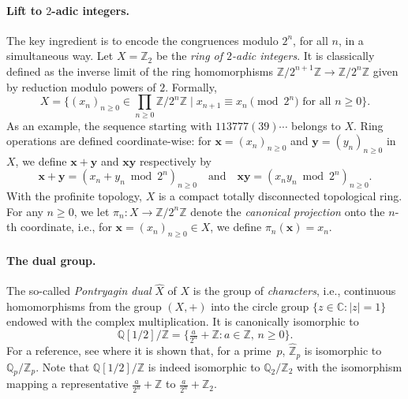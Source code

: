 \documentclass[12pt,reqno]{article}
\newcommand{\Z}{\mathbb{Z}}
\begin{document}

\paragraph{Lift to $2$-adic integers.} The key ingredient is to encode the congruences modulo $2^n$, for all $n$, in a simultaneous way. Let $X=\Z_2$ be the \emph{ring of $2$-adic integers}.  It is classically defined as the inverse limit of the ring homomorphisms
$\Z/2^{n+1}\Z \to \Z/2^n\Z$ given by
reduction modulo powers of $2$.
Formally,
\[
    X =
    \biggl\{(x_n)_{n\ge0} \in \prod_{n\ge0}\Z/2^n\Z
    \mid x_{n+1} \equiv x_n \pmod{2^n} \text{ for all $n\ge 0$}\biggr\}.
\]
As an example,  the sequence starting with $113777(39)\cdots$ belongs to $X$.
Ring operations are defined coordinate-wise: 
for $\mathbf{x}=(x_n)_{n\ge0}$ and $\mathbf{y}=(y_n)_{n\ge0}$ in $X$,  we define $\mathbf{x}+\mathbf{y}$ and $\mathbf{x}\mathbf{y}$ respectively by
\[
    \mathbf{x}+\mathbf{y} = (x_n+y_n \bmod 2^n)_{n\ge0}
    \quad \text{and} \quad
    \mathbf{x}\mathbf{y} = (x_n y_n \bmod 2^n)_{n\ge0}.
\]
With the profinite topology, $X$ is a compact totally disconnected
topological ring.  For any $n\ge 0$,   we let $\pi_n : X \to \Z/2^n\Z$ denote the \emph{canonical
projection} onto the $n$-th coordinate,  i.e.,  for $\mathbf{x}=(x_n)_{n\ge0}\in X$,  we define $\pi_n(\mathbf{x})=x_n$.


\paragraph{The dual group.} 
The so-called {\em Pontryagin dual}  $\widehat X$ of $X$ is the group of \emph{characters},  i.e., continuous homomorphisms from the group $(X,+)$ into the circle group $\{z\in\mathbb{C}: |z|=1\}$ endowed with the complex multiplication. It is canonically isomorphic to 
\[
     \mathbb{Q}[1/2]/\mathbb{Z}
    = \bigl\{\tfrac{a}{2^n} + \mathbb{Z} : a\in\mathbb{Z},\, n\ge0\bigr\}.
  \]
  For a reference, see \cite[p.~113]{AHA} where it is shown that, for a prime~$p$, $\widehat{\mathbb{Z}}_p$ is isomorphic to $\mathbb{Q}_p/\mathbb{Z}_p$. Note that $\mathbb{Q}[1/2]/\mathbb{Z}$ is indeed isomorphic to $\mathbb{Q}_2/\mathbb{Z}_2$ with the isomorphism mapping a representative $\tfrac{a}{2^n} + \mathbb{Z}$ to  $\tfrac{a}{2^n} + \mathbb{Z}_2$.
  
\end{document}
